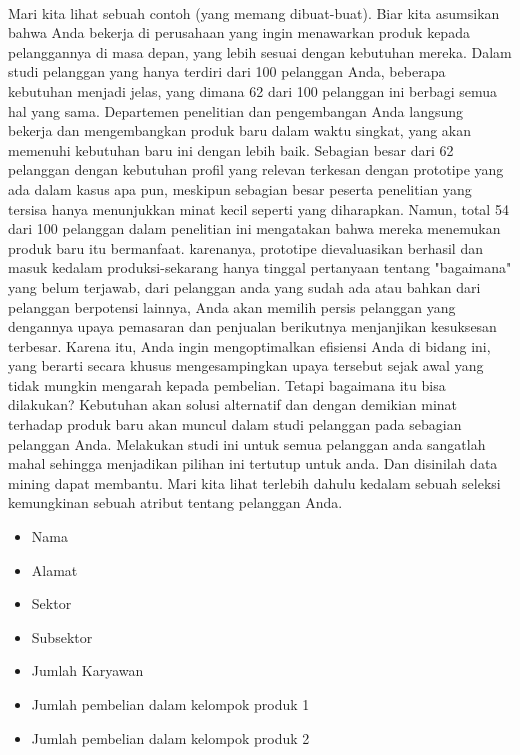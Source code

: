 \paragraph{} Mari kita lihat sebuah contoh (yang memang dibuat-buat). Biar kita asumsikan bahwa Anda bekerja di perusahaan yang ingin menawarkan produk kepada pelanggannya di masa depan, yang lebih sesuai dengan kebutuhan mereka. Dalam studi pelanggan yang hanya terdiri dari 100 pelanggan Anda, beberapa kebutuhan menjadi jelas, yang dimana 62 dari 100 pelanggan ini berbagi semua hal yang sama. Departemen penelitian dan pengembangan Anda langsung bekerja dan mengembangkan produk baru dalam waktu singkat, yang akan memenuhi kebutuhan baru ini dengan lebih baik. Sebagian besar dari 62 pelanggan dengan kebutuhan profil yang relevan terkesan dengan prototipe yang ada dalam kasus apa pun, meskipun sebagian besar peserta penelitian yang tersisa hanya menunjukkan minat kecil seperti yang diharapkan. Namun, total 54 dari 100 pelanggan dalam penelitian ini mengatakan bahwa mereka menemukan produk baru itu bermanfaat. karenanya, prototipe dievaluasikan berhasil dan masuk kedalam produksi-sekarang hanya tinggal pertanyaan tentang "bagaimana" yang belum terjawab, dari pelanggan anda yang sudah ada atau bahkan dari pelanggan berpotensi lainnya, Anda akan memilih persis pelanggan yang dengannya upaya pemasaran dan penjualan berikutnya menjanjikan kesuksesan terbesar. Karena itu, Anda ingin mengoptimalkan efisiensi Anda di bidang ini, yang berarti secara khusus mengesampingkan upaya tersebut sejak awal yang tidak mungkin mengarah kepada pembelian. Tetapi bagaimana itu bisa dilakukan? Kebutuhan akan solusi alternatif dan dengan demikian minat terhadap produk baru akan muncul dalam studi pelanggan pada sebagian pelanggan Anda. Melakukan studi ini untuk semua pelanggan anda sangatlah mahal sehingga menjadikan pilihan ini tertutup untuk anda. Dan disinilah data mining dapat membantu. Mari kita lihat terlebih dahulu kedalam sebuah seleksi kemungkinan sebuah atribut tentang pelanggan Anda.

\begin{itemize}
    \item 	Nama 
 \item	Alamat 
 \item	Sektor 
 \item	Subsektor 
 \item	Jumlah Karyawan 
 \item	Jumlah pembelian dalam kelompok produk 1 
 \item	Jumlah pembelian dalam kelompok produk 2

\end{itemize}

